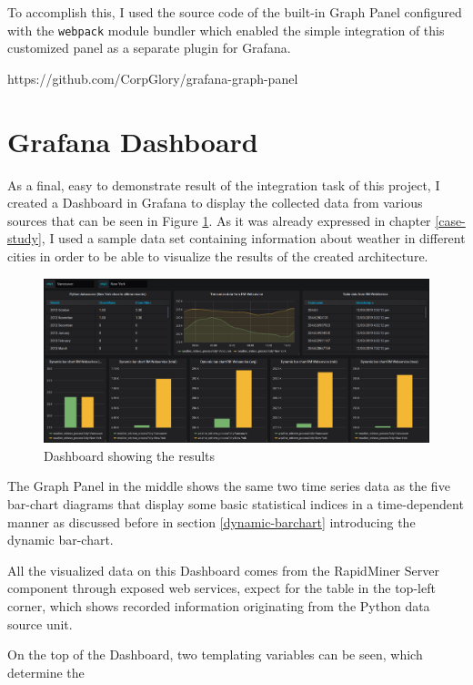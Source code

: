 To accomplish this, I used the source code of the built-in Graph Panel configured with the \texttt{webpack} module bundler which enabled the simple integration of this customized panel as a separate plugin for Grafana.

https://github.com/CorpGlory/grafana-graph-panel

\section{Grafana Dashboard}

As a final, easy to demonstrate result of the integration task of this project, I created a Dashboard in Grafana to display the collected data from various sources that can be seen in Figure \ref{fig:dashboard-final}. As it was already expressed in chapter \ref{case-study}, I used a sample data set containing information about weather in different cities in order to be able to visualize the results of the created architecture.

\begin{figure}[h]
	\centering
	\includegraphics[width=\linewidth, keepaspectratio]{figures/final-dashboard.png}
	\caption{Dashboard showing the results}
	\label{fig:dashboard-final}
\end{figure}

The Graph Panel in the middle shows the same two time series data as the five bar-chart diagrams that display some basic statistical indices in a time-dependent manner as discussed before in section \ref{dynamic-barchart} introducing the dynamic bar-chart.

All the visualized data on this Dashboard comes from the RapidMiner Server component through exposed web services, expect for the table in the top-left corner, which shows recorded information originating from the Python data source unit.

On the top of the Dashboard, two templating variables can be seen, which determine the
